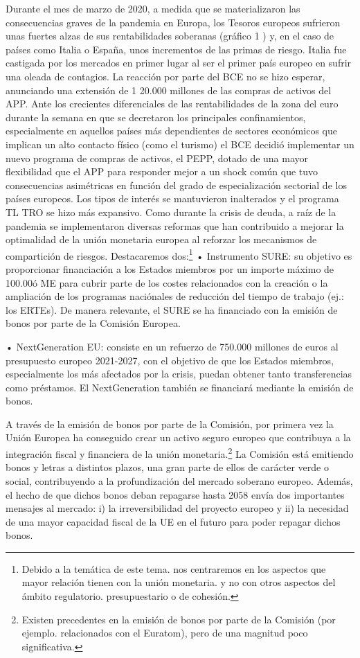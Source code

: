 \documentclass[10pt,a4paper]{article}
\begin{document}
{Durante el mes de marzo de 2020, a medida que se materializaron las consecuencias graves de la pandemia en Europa, los Tesoros europeos sufrieron unas fuertes alzas de sus rentabilidades soberanas (gráfico 1 ) y, en el caso de países como Italia o España, unos incrementos de las primas de riesgo. Italia fue castigada por los mercados en primer lugar al ser el primer país europeo en sufrir una oleada de contagios. La reacción por parte del BCE no se hizo esperar, anunciando una extensión de 1 20.000 millones de las compras de activos del APP. Ante los crecientes diferenciales de las rentabilidades de la zona del euro durante la semana en que se decretaron los principales confinamientos, especialmente en aquellos países más dependientes de sectores económicos que implican un alto contacto físico (como el turismo) el BCE decidió implementar un nuevo programa de compras de activos, el PEPP, dotado de una mayor flexibilidad que el APP para responder mejor a un shock común que tuvo consecuencias asimétricas en función del grado de especialización sectorial de los países europeos. Los tipos de interés se mantuvieron inalterados y el programa TL TRO se hizo más expansivo. Como durante la crisis de deuda, a raíz de la pandemia se implementaron diversas reformas que han contribuido a mejorar la optimalidad de la unión monetaria europea al reforzar los mecanismos de compartición de riesgos. Destacaremos dos:\footnote{%
    Debido a la temática de este tema. nos centraremos en los aspectos que mayor relación tienen con la unión monetaria. y no con otros aspectos del ámbito regulatorio. presupuestario o de cohesión.
} 
• Instrumento SURE: su objetivo es proporcionar financiación a los Estados miembros por un importe máximo de 100.00ó ME para cubrir parte de los costes relacionados con la creación o la ampliación de los programas naciónales de reducción del tiempo de trabajo (ej.: los ERTEs). De manera relevante, el SURE se ha financiado con la emisión de bonos por parte de la Comisión Europea.

• NextGeneration EU: consiste en un refuerzo de 750.000 millones de euros al presupuesto europeo 2021-2027, con el objetivo de que los Estados miembros, especialmente los más afectados por la crisis, puedan obtener tanto transferencias como préstamos. El NextGeneration también se financiará mediante la emisión de bonos.

A través de la emisión de bonos por parte de la Comisión, por primera vez la Unión Europea ha conseguido crear un activo seguro europeo que contribuya a la integración fiscal y financiera de la unión monetaria.\footnote{%
    Existen precedentes en la emisión de bonos por parte de la Comisión (por ejemplo. relacionados con el Euratom), pero de una magnitud poco significativa.
} La Comisión está emitiendo bonos y letras a distintos plazos, una gran parte de ellos de carácter verde o social, contribuyendo a la profundización del mercado soberano europeo. Además, el hecho de que dichos bonos deban repagarse hasta 2058 envía dos importantes mensajes al mercado: i) la irreversibilidad del proyecto europeo y ii) la necesidad de una mayor capacidad fiscal de la UE en el futuro para poder repagar dichos bonos.

}
\end{document}

